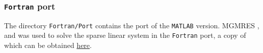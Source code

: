 \subsubsection{\texttt{Fortran} port}\label{sec_fortran_port_porous}
The directory \texttt{Fortran/Port} contains the port of the \texttt{MATLAB} version. MGMRES \cite{Barrett_1994},\cite{Kelley_1995} and \cite{Saad_2003} was used to solve the sparse linear system in the \texttt{Fortran} port, a copy of which can be obtained \href{http://people.sc.fsu.edu/~jburkardt/m_src/mgmres/mgmres.html}{here}.\\
%
%
%
